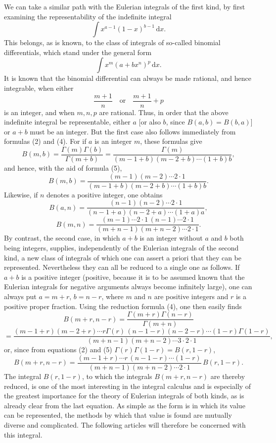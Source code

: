 \documentclass[11pt]{article}
\newcommand{\dd}{\,\mathrm d}
\begin{document}
We can take a similar path with the Eulerian integrals of the first kind, by first examining the representability of the indefinite integral
\[
\int x^{a-1}(1-x)^{b-1}\dd x.
\]
This belongs, as is known, to the class of integrals of so-called binomial differentials, which stand under the general form
\[
\int x^m(a+bx^n)^p\dd x.
\]
It is known that the binomial differential can always be made rational, and hence integrable, when either
\[
\frac{m+1}{n}\quad\text{or}\quad \frac{m+1}{n}+p
\]
is an integer, and when $m,n,p$ are rational. Thus, in order that the above indefinite integral be representable, either $a$ [or also $b$, since $B(a,b)=B(b,a)$] or $a+b$ must be an integer. But the first case also follows immediately from formulas (2) and (4). For if $a$ is an integer $m$, these formulas give
\[
B(m,b)=\frac{\Gamma(m)\Gamma(b)}{\Gamma(m+b)}=
\frac{\Gamma(m)}{(m-1+b)(m-2+b)\cdots(1+b)b},
\]
and hence, with the aid of formula (5),
\begin{equation}
B(m,b)=\frac{(m-1)(m-2)\cdots2\cdot1}{(m-1+b)(m-2+b)\cdots(1+b)b}.
\tag{6}
\end{equation}
Likewise, if $n$ denotes a positive integer, one obtains
\[
B(a,n)=\frac{(n-1)(n-2)\cdots2\cdot1}{(n-1+a)(n-2+a)\cdots(1+a)a},
\]
\[
B(m,n)=\frac{(m-1)\cdots2\cdot1\,(n-1)\cdots2\cdot1}{(m+n-1)(m+n-2)\cdots2\cdot1}.
\]
By contrast, the second case, in which $a+b$ is an integer without $a$ and $b$ both being integers, supplies, independently of the Eulerian integrals of the second kind, a new class of integrals of which one can assert a priori that they can be represented. Nevertheless they can all be reduced to a single one as follows. If $a+b$ is a positive integer (positive, because it is to be assumed known that the Eulerian integrals for negative arguments always become infinitely large), one can always put $a=m+r$, $b=n-r$, where $m$ and $n$ are positive integers and $r$ is a positive proper fraction. Using the reduction formula (4), one then easily finds
\[
B(m+r,n-r)=\frac{\Gamma(m+r)\Gamma(n-r)}{\Gamma(m+n)}
\]
\[
=\frac{(m-1+r)(m-2+r)\cdots r\Gamma(r)\,(n-1-r)(n-2-r)\cdots(1-r)\Gamma(1-r)}{(m+n-1)(m+n-2)\cdots3\cdot2\cdot1},
\]
or, since from equations (2) and (5) $\Gamma(r)\Gamma(1-r)=B(r,1-r)$,
\begin{equation}
B(m+r,n-r)=\frac{(m-1+r)\cdots r\,(n-1-r)\cdots(1-r)}{(m+n-1)(m+n-2)\cdots2\cdot1}\,B(r,1-r).
\tag{7}
\end{equation}
The integral $B(r,1-r)$, to which the integrals $B(m+r,n-r)$ are thereby reduced, is one of the most interesting in the integral calculus and is especially of the greatest importance for the theory of Eulerian integrals of both kinds, as is already clear from the last equation. As simple as the form is in which its value can be represented, the methods by which that value is found are mutually diverse and complicated. The following articles will therefore be concerned with this integral.
\end{document}
